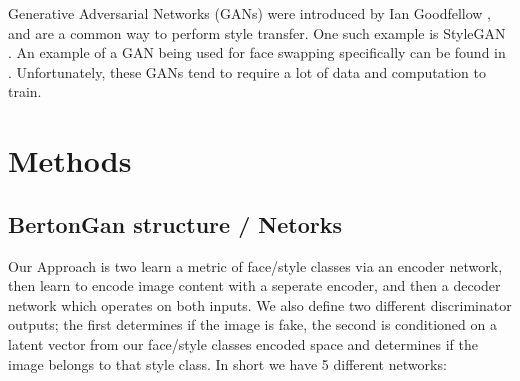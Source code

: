 \documentclass{article}
\begin{document}
Generative Adversarial Networks (GANs) were introduced by Ian Goodfellow \cite{goodfellow2020generative},
and are a common way to perform style transfer.
One such example is StyleGAN \cite{karras2019style}.
An example of a GAN being used for face swapping specifically can be found in \cite{lin2020using}.
Unfortunately, these GANs tend to require a lot of data and computation to train.


\section{Methods}

\subsection{BertonGan structure / Netorks}

Our Approach is two learn a metric of face/style classes via an encoder network,
then learn to encode image content with a seperate encoder, and then a decoder network which operates on both inputs.
We also define two different discriminator outputs; the first determines if the image is fake,
the second is conditioned on a latent vector from our face/style classes encoded space and determines if the image
belongs to that style class.
In short we have 5 different networks:
\end{document}
